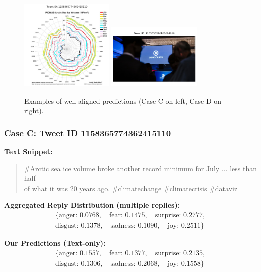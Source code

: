 \begin{figure}[ht]
    \centering
    \includegraphics[width=0.4\textwidth]{images/good1.png} 
    \hfill
    \includegraphics[width=0.4\textwidth]{images/good2.png}
    \caption{Examples of well-aligned predictions (Case C on left, Case D on right).}
    \label{fig:good_cases}
\end{figure}

\subsubsection*{Case C: Tweet ID 1158365774362415110}

\noindent\textbf{Text Snippet:}
\begin{quote}
\#Arctic sea ice volume broke another record minimum for July ... less than half \\
of what it was 20 years ago. \#climatechange \#climatecrisis \#dataviz
\end{quote}

\noindent\textbf{Aggregated Reply Distribution (multiple replies):}
\[
\begin{aligned}
\{\text{anger: } 0.0768, \quad \text{fear: } 0.1475, \quad \text{surprise: } 0.2777, \\
\text{disgust: } 0.1378, \quad \text{sadness: } 0.1090, \quad \text{joy: } 0.2511\}
\end{aligned}
\]

\noindent\textbf{Our Predictions (Text-only):}
\[
\begin{aligned}
\{\text{anger: } 0.1557, \quad \text{fear: } 0.1377, \quad \text{surprise: } 0.2135, \\
\text{disgust: } 0.1306, \quad \text{sadness: } 0.2068, \quad \text{joy: } 0.1558\}
\end{aligned}
\]

